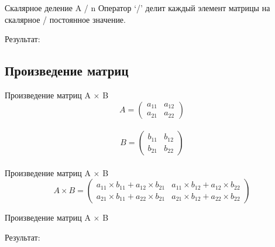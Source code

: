 \documentclass[12pt]{beamer}
\begin{document}
\begin{frame}{Скалярное деление A / n}
Оператор ‘/’ делит каждый элемент матрицы на скалярное / постоянное значение.
\vspace{0.2cm}

Результат: \\

\end{frame}


\subsection{Произведение матриц}
\begin{frame}{Произведение матриц A $\times$ B}
\[
  A = 
  \begin{pmatrix}
    a_{11} & a_{12} \\
    a_{21} & a_{22} 
  \end{pmatrix} 
\]
\\
\[
  B = 
  \begin{pmatrix}
    b_{11} & b_{12} \\
    b_{21} & b_{22} 
  \end{pmatrix}
\]
\\
\vspace{0.5cm}
Произведение матриц A $\times$ B
\\
\[
  A \times B = 
  \begin{pmatrix}
    a_{11} \times b_{11} + a_{12} \times b_{21} & a_{11} \times b_{12} + a_{12} \times b_{22} \\
    a_{21} \times b_{11} + a_{22} \times b_{21} & a_{21} \times b_{12} + a_{22} \times b_{22} 
  \end{pmatrix}
\]
\end{frame}


\begin{frame}{Произведение матриц A $\times$ B}

Результат: \\

\end{frame}
\end{document}
